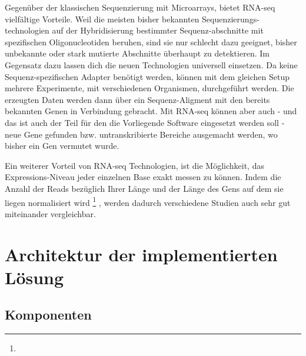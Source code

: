 \documentclass[a4paper]{thesis}
\begin{document}
Gegenüber der klassischen Sequenzierung mit Microarrays, bietet RNA-seq
vielfältige Vorteile. Weil die meisten bisher bekannten Sequenzierungs-
technologien auf der Hybridisierung bestimmter Sequenz-abschnitte mit
spezifischen Oligonucleotiden beruhen, sind sie nur schlecht dazu geeignet,
bisher unbekannte oder stark mutierte Abschnitte überhaupt zu detektieren.
Im Gegensatz dazu lassen dich die neuen Technologien universell einsetzen. Da
keine Sequenz-spezifischen Adapter benötigt werden, können mit dem gleichen
Setup mehrere Experimente, mit verschiedenen Organismen, durchgeführt werden.
Die erzeugten Daten werden dann über ein Sequenz-Aligment mit den bereits
bekannten Genen in Verbindung gebracht. Mit RNA-seq können aber auch - und
das ist auch der Teil für den die Vorliegende Software eingesetzt werden
soll - neue Gene gefunden bzw. untranskribierte Bereiche
ausgemacht werden, wo bisher ein Gen vermutet wurde.
\cite{croucher_studying_2010}

\def\fnI{
	Third, whereas hybridization-based methods measure gene expression
	levels through detection of fluorescence or radioactivity, RNA-seq
	uses the amount of data matching a given coding sequence (CDS),
	typically quantified as reads per kilobase CDS length per million
	reads analyzed (RPKM) [4].
	\cite{croucher_studying_2010}
}

Ein weiterer Vorteil von RNA-seq Technologien, ist die Möglichkeit,
das Expressions-Niveau jeder einzelnen Base exakt messen zu können.
Indem die Anzahl der Reads bezüglich Ihrer Länge und der Länge des
Gens auf dem sie liegen normalisiert wird \footnote{\expandafter\fnI}
, werden
dadurch verschiedene Studien auch sehr gut miteinander vergleichbar.
\cite{croucher_studying_2010,wang_rna-seq:_2009}



\section{Architektur der implementierten Lösung}



\subsection{Komponenten}
\end{document}
